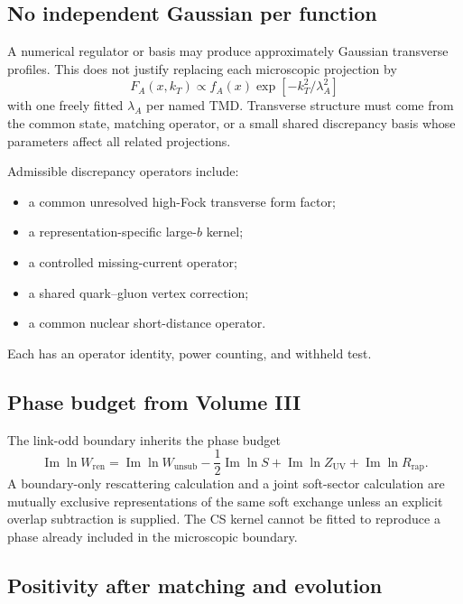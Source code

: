 \documentclass[11pt]{article}
\newcommand{\ren}{\mathrm{ren}}
\newcommand{\unsub}{\mathrm{unsub}}
\newcommand{\rap}{\mathrm{rap}}
\newcommand{\UV}{\mathrm{UV}}
\begin{document}
\subsection{No independent Gaussian per function}

A numerical regulator or basis may produce approximately Gaussian transverse
profiles.  This does not justify replacing each microscopic projection by
\begin{equation}
 F_A(x,k_T)\propto f_A(x)
 \exp[-k_T^2/\lambda_A^2]
 \label{eq:forbidden-independent-gaussian}
\end{equation}
with one freely fitted \(\lambda_A\) per named TMD.  Transverse structure must
come from the common state, matching operator, or a small shared discrepancy
basis whose parameters affect all related projections.

Admissible discrepancy operators include:
\begin{itemize}
\item a common unresolved high-Fock transverse form factor;
\item a representation-specific large-\(b\) kernel;
\item a controlled missing-current operator;
\item a shared quark--gluon vertex correction;
\item a common nuclear short-distance operator.
\end{itemize}
Each has an operator identity, power counting, and withheld test.

\subsection{Phase budget from Volume III}

The link-odd boundary inherits the phase budget
\begin{equation}
 \operatorname{Im}\ln W_{\ren}
 =
 \operatorname{Im}\ln W_{\unsub}
 -\frac12\operatorname{Im}\ln S
 +\operatorname{Im}\ln Z_{\UV}
 +\operatorname{Im}\ln R_{\rap}.
 \label{eq:phase-budget-repeated}
\end{equation}
A boundary-only rescattering calculation and a joint soft-sector calculation
are mutually exclusive representations of the same soft exchange unless an
explicit overlap subtraction is supplied.  The CS kernel cannot be fitted to
reproduce a phase already included in the microscopic boundary.

\subsection{Positivity after matching and evolution}
\end{document}
